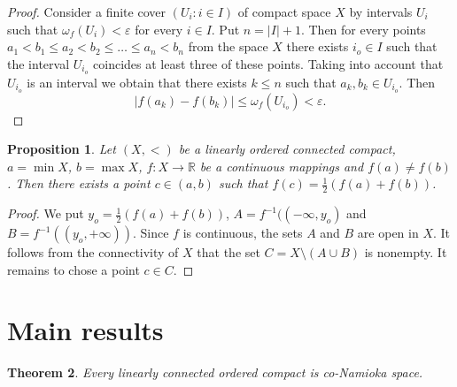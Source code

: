 \documentclass{amsart}
\newtheorem{theorem}{Theorem}[section]
\newtheorem{proposition}[theorem]{Proposition}
\begin{document}
\begin{proof} Consider a finite cover $(U_i:i\in I)$ of compact space $X$ by intervals $U_i$ such that $\omega_f(U_i)<\varepsilon$ for every $i\in I$. Put $n=|I|+1$. Then for every points $a_1< b_1\leq a_2 < b_2 \leq \dots \leq a_n<b_n$ from the space $X$ there exists $i_o\in I$ such that the interval $U_{i_o}$ coincides at least three of these points. Taking into account that $U_{i_o}$ is an interval we obtain that there exists $k\leq n$ such that $a_k, b_k \in U_{i_o}$. Then $$|f(a_k)-f(b_k)|\leq \omega_f(U_{i_o})<\varepsilon.$$
\end{proof}

\begin{proposition}\label{p:2.2} Let $(X,<)$ be a linearly ordered connected compact, $a=\min X$, $b=\max X$, $f:X\to {\mathbb R}$ be a continuous mappings and  $f(a)\ne f(b)$. Then there exists a point $c\in (a,b)$ such that $f(c)=\frac{1}{2}(f(a)+f(b))$.\end{proposition}

\begin{proof} We put $y_o=\frac{1}{2}(f(a)+f(b))$, $A=f^{-1}((-\infty,y_o)$ and $B=f^{-1}((y_o,+\infty))$. Since $f$ is continuous, the sets $A$ and $B$ are open in $X$. It follows from the connectivity of $X$ that the set $C=X\setminus (A\cup B)$ is nonempty. It remains to chose a point $c\in C$.
 \end{proof}

\section{Main results}

\begin{theorem}\label{th:3.1} Every linearly connected ordered compact is co-Namioka space.
\end{theorem}
\end{document}

